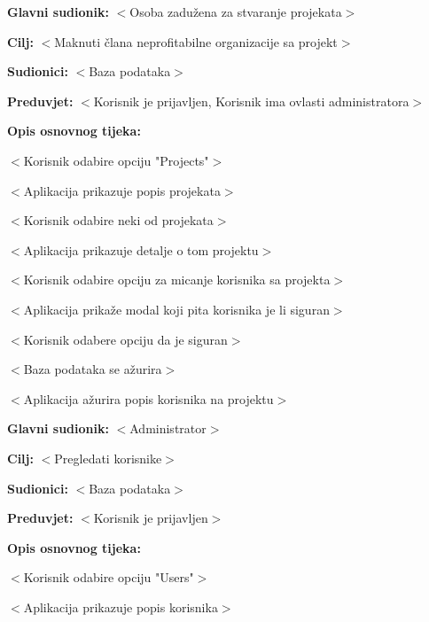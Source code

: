 					\noindent {}
					\begin{packed_item}

						\item \textbf{Glavni sudionik:} $<$Osoba zadužena za stvaranje projekata$>$
						\item \textbf{Cilj:} $<$Maknuti člana neprofitabilne organizacije sa projekt$>$
						\item \textbf{Sudionici:} $<$Baza podataka$>$
						\item \textbf{Preduvjet:} $<$Korisnik je prijavljen, Korisnik ima ovlasti administratora$>$
						\item \textbf{Opis osnovnog tijeka:}

						\item[] \begin{packed_enum}

							\item $<$Korisnik odabire opciju "Projects"$>$
							\item $<$Aplikacija prikazuje popis projekata$>$
							\item $<$Korisnik odabire neki od projekata$>$
							\item $<$Aplikacija prikazuje detalje o tom projektu$>$
							\item $<$Korisnik odabire opciju za micanje korisnika sa projekta$>$
							\item $<$Aplikacija prikaže modal koji pita korisnika je li siguran$>$
							\item $<$Korisnik odabere opciju da je siguran$>$
							\item $<$Baza podataka se ažurira$>$
							\item $<$Aplikacija ažurira popis korisnika na projektu$>$
						\end{packed_enum}

					\end{packed_item}

					\noindent \underbar{\textbf{UC$<$19$>$ -$<$Pregled korisnika$>$}}
					\begin{packed_item}

						\item \textbf{Glavni sudionik:} $<$Administrator$>$
						\item \textbf{Cilj:} $<$Pregledati korisnike$>$
						\item \textbf{Sudionici:} $<$Baza podataka$>$
						\item \textbf{Preduvjet:} $<$Korisnik je prijavljen$>$
						\item \textbf{Opis osnovnog tijeka:}

						\item[] \begin{packed_enum}

							\item $<$Korisnik odabire opciju "Users"$>$
							\item $<$Aplikacija prikazuje popis korisnika$>$
                            
						\end{packed_enum}
					\end{packed_item}

